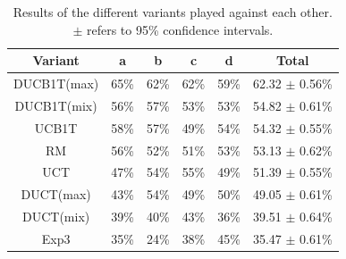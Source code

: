 \documentclass{article}
\begin{document}
\begin{table}
\scriptsize
\begin{minipage}{.51\textwidth}
\begin{tabular}{|c||c|c|c|c|c|}
									\hline
 Variant	& a 		  & b 		  & c 		  & d 		  & Total 	\\ \hline
 DUCB1T(max) & 65\% & 62\% & 62\% & 59\% & 62.32 $\pm$ 0.56\% \\ \hline
 DUCB1T(mix) & 56\% & 57\% & 53\% & 53\% & 54.82 $\pm$ 0.61\% \\ \hline
 UCB1T & 58\% & 57\% & 49\% & 54\% & 54.32 $\pm$ 0.55\% \\ \hline
        RM & 56\% & 52\% & 51\% & 53\% & 53.13 $\pm$ 0.62\% \\ \hline
   UCT & 47\% & 54\% & 55\% & 49\% & 51.39 $\pm$ 0.55\% \\ \hline
   DUCT(max) & 43\% & 54\% & 49\% & 50\% & 49.05 $\pm$ 0.61\% \\ \hline
   DUCT(mix) & 39\% & 40\% & 43\% & 36\% & 39.51 $\pm$ 0.64\% \\ \hline
      Exp3 & 35\% & 24\% & 38\% & 45\% & 35.47 $\pm$ 0.61\% \\ \hline
\end{tabular}
\caption{Results of the different variants played against each other. $\pm$ refers to 95\% confidence intervals. \label{tbl:overall-avgs}}
\end{minipage}
~~~~~
\begin{minipage}{.4\textwidth}
\scriptsize

\end{minipage}
\end{table}
\end{document}
